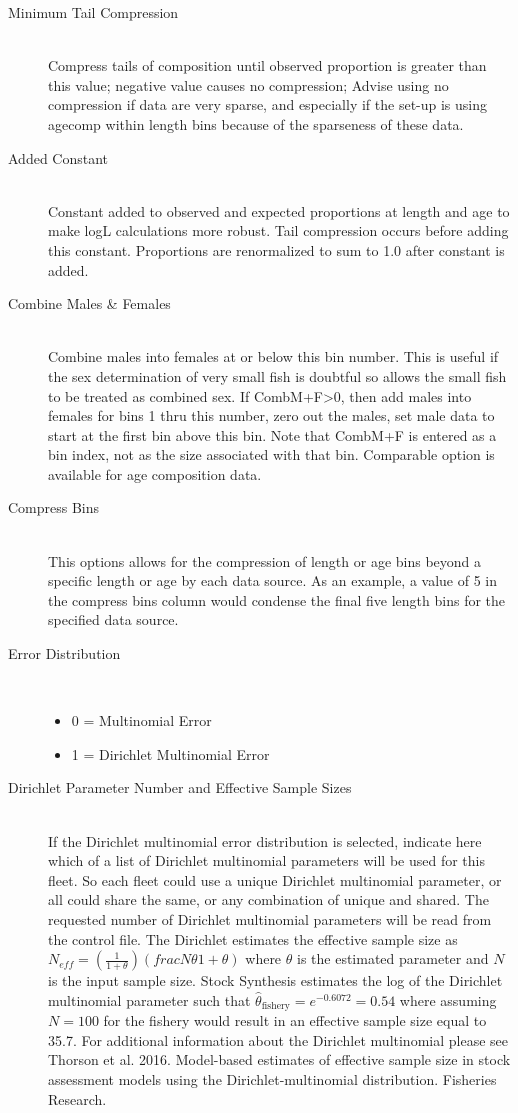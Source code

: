 \begin{description}
	\item[Minimum Tail Compression]\hfill\\
	Compress tails of composition until observed proportion is greater than this value; negative value causes no compression; Advise using no compression if data are very sparse, and especially if the set-up is using agecomp within length bins because of the sparseness of these data.
	\item[Added Constant]\hfill\\
	Constant added to observed and expected proportions at length and age to make logL calculations more robust.  Tail compression occurs before adding this constant.  Proportions are renormalized to sum to 1.0 after constant is added.
	\item[Combine Males \& Females]\hfill\\
	Combine males into females at or below this bin number.  This is useful if the sex determination of very small fish is doubtful so allows the small fish to be treated as combined sex.  If CombM+F>0, then add males into females for bins 1 thru this number, zero out the males, set male data to start at the first bin above this bin.  Note that CombM+F is entered as a bin index, not as the size associated with that bin.  Comparable option is available for age composition data.
	\item[Compress Bins]\hfill\\
	This options allows for the compression of length or age bins beyond a specific length or age by each data source.  As an example,  a value of 5 in the compress bins column would condense the final five length bins for the specified data source.
	\item[Error Distribution]\
	\begin{itemize}
		\item 0 = Multinomial Error
		\item 1 = Dirichlet Multinomial Error
	\end{itemize}
	\item[Dirichlet Parameter Number and Effective Sample Sizes]\hfill\\
	If the Dirichlet multinomial error distribution is selected, indicate here which of a list of Dirichlet multinomial parameters will be used for this fleet.  So each fleet could use a unique Dirichlet multinomial parameter, or all could share the same, or any combination of unique and shared.  The requested number of Dirichlet multinomial parameters will be read from the control file.  The Dirichlet estimates the effective sample size as $N_{eff}=(\frac{1}{1+\theta})(frac{N\theta}{1+\theta})$ where $\theta$ is the estimated parameter and $N$ is the input sample size.  Stock Synthesis estimates the log of the Dirichlet multinomial parameter such that $\hat{\theta}_{\text{fishery}} = e^{-0.6072} = 0.54$ where assuming $N=100$ for the fishery would result in an effective sample size equal to 35.7.  For additional information about the Dirichlet multinomial please see Thorson et al. 2016. Model-based estimates of effective sample size in stock assessment models using the Dirichlet-multinomial distribution. Fisheries Research.
\end{description}

